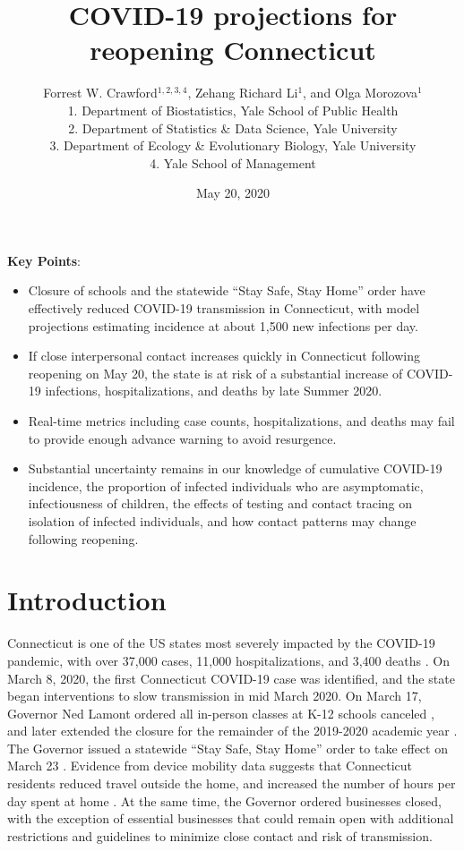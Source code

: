 \documentclass[11pt]{article}
\title{COVID-19 projections for reopening Connecticut}
\author{
  Forrest W. Crawford$^{1,2,3,4}$,
  Zehang Richard Li$^1$,
  and
  Olga Morozova$^{1}$
  \\[1em]
\small 1. Department of Biostatistics, Yale School of Public Health \\
\small 2. Department of Statistics \& Data Science, Yale University \\
\small 3. Department of Ecology \& Evolutionary Biology, Yale University \\
\small 4. Yale School of Management }
\date{May 20, 2020}
\begin{document}
\maketitle


\textbf{Key Points}:
\vspace{-0.5em}
\begin{itemize}%
	\setlength\itemsep{0em}
	\setlength\parsep{0em}
	\setlength\topsep{0em}
  \item Closure of schools and the statewide ``Stay Safe, Stay Home'' order have effectively reduced COVID-19 transmission in Connecticut, with model projections estimating incidence at about 1,500 new infections per day.
  \item If close interpersonal contact increases quickly in Connecticut following reopening on May 20, the state is at risk of a substantial increase of COVID-19 infections, hospitalizations, and deaths by late Summer 2020.
  \item Real-time metrics including case counts, hospitalizations, and deaths may fail to provide enough advance warning to avoid resurgence.  
  \item Substantial uncertainty remains in our knowledge of cumulative COVID-19 incidence, the proportion of infected individuals who are asymptomatic, infectiousness of children, the effects of testing and contact tracing on isolation of infected individuals, and how contact patterns may change following reopening.  
\end{itemize}



\section*{Introduction}

Connecticut is one of the US states most severely impacted by the COVID-19 pandemic, with over 37,000 cases, 11,000 hospitalizations, and 3,400 deaths \citep{nyt2020Connecticut,atlantic2020data}.  On March 8, 2020, the first Connecticut COVID-19 case was identified, and the state began interventions to slow transmission in mid March 2020.  On March 17, Governor Ned Lamont ordered all in-person classes at K-12 schools canceled \citep{lamont2020exec7c}, and later extended the closure for the remainder of the 2019-2020 academic year \citep{lamont2020exec7l,lamont2020exec7x,lamont2020exec7ii}.  The Governor issued a statewide ``Stay Safe, Stay Home'' order to take effect on March 23 \citep{lamont2020exec7h}.  Evidence from device mobility data suggests that Connecticut residents reduced travel outside the home, and increased the number of hours per day spent at home \citep{google2020covid,facebook2020covid}. At the same time, the Governor ordered businesses closed, with the exception of essential businesses that could remain open with additional restrictions and guidelines to minimize close contact and risk of transmission. 
\end{document}
